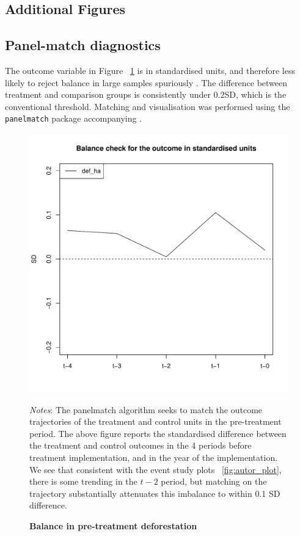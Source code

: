 \documentclass[12pt,reqno]{article}
\begin{document}
\begin{refsection}

% 

\pagebreak
\section{Additional Figures} %
\subsection{Panel-match diagnostics }

The outcome variable in Figure ~\ref{fig:panelmatchbal} is in standardised units, and therefore less likely to reject balance in
large samples spuriously \parencite{imbens2015causal}. The difference between treatment and
comparison groups is consistently under $0.2$SD, which is the conventional threshold. Matching and visualisation was performed using the \texttt{panelmatch} package accompanying \textcite{Imai2019-kp}.


\begin{figure}[htbp!]
\begin{center}
\begin{minipage}{1 \linewidth}
  \caption{\textbf{Balance in pre-treatment deforestation}}
  \label{fig:panelmatchbal}	
\centerline{\includegraphics[width=4 in,angle=0]{Output/PanelMatch_bal.pdf}}
\smallskip
\scriptsize
\emph{Notes}: The panelmatch algorithm seeks to match the outcome trajectories of the treatment and control units in the pre-treatment period. The above figure reports the standardised difference between the treatment and control outcomes in the 4 periods before treatment implementation, and in the year of the implementation. We see that consistent with the event study plots ~\ref{fig:autor_plot}, there is some trending in the $t-2$ period, but matching on the trajectory substantially attenuates this imbalance to within 0.1 SD difference.


\end{minipage}
\end{center}
\end{figure}
\end{refsection}
\end{document}
